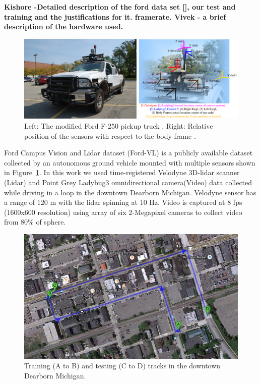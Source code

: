 \documentclass{article}
\begin{document}
\textbf{ Kishore -Detailed description of the ford data set [], our test and training and the justifications for it. framerate. 
Vivek - a brief description of the hardware used. }

\begin{figure}[htbp]
    \centering
        \includegraphics[scale=0.45]{Figures/ford-truck-sensors.png}
    \caption{Left: The modified Ford F-250 pickup truck \cite{Pandey2011Ford-campu}. Right: Relative position of the sensors with respect to the body frame \cite{Pandey2011Ford-campu}.}
    \label{fig:ford-truck-sensors}
\end{figure}

Ford Campus Vision and Lidar dataset \citep{Pandey2011Ford-campu} (Ford-VL) is a publicly available dataset collected by an autonomous ground vehicle mounted with multiple sensors shown in Figure~\ref{fig:ford-truck-sensors}. In this work we used time-registered Velodyne 3D-lidar scanner (Lidar) and Point Grey Ladybug3 omnidirectional camera(Video) data collected while driving in a loop in the downtown Dearborn Michigan. Velodyne sensor has a range of 120 m with the lidar spinning at 10 Hz. Video is captured at 8 fps (1600x600 resolution) using array of six 2-Megapixel cameras to collect video from 80\% of sphere.  

\begin{figure}[htbp]
    \centering
        \includegraphics[scale=0.35]{Figures/ford_train_test_track.jpg}
    \caption{Training (A to B) and testing (C to D) tracks in the downtown Dearborn Michigan.}
    \label{fig:ford_train_test_track}
\end{figure}
\end{document}
